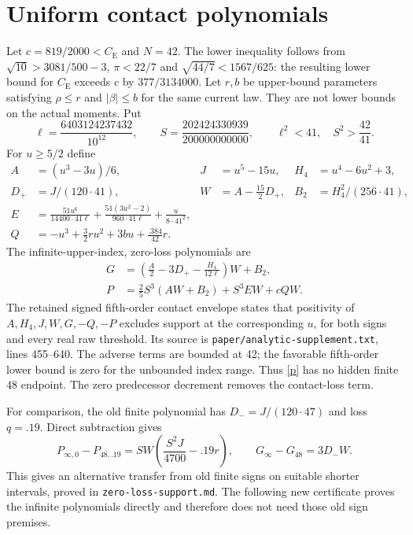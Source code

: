 \documentclass[11pt]{article}
\newcommand{\CE}{C_{\mathrm E}}
\begin{document}
\section{Uniform contact polynomials}
Let $c=819/2000<\CE$ and $N=42$. The lower inequality follows from
$\sqrt{10}>3081/500-3$, $\pi<22/7$ and
$\sqrt{44/7}<1567/625$: the resulting lower bound for $\CE$ exceeds
$c$ by $377/3134000$. Let $r,b$ be upper-bound parameters satisfying
$\rho\le r$ and $|\beta|\le b$ for the same current law.
They are not lower bounds on the actual moments. Put
\[
 \ell=\frac{6403124237432}{10^{12}},\qquad
 S=\frac{202424330939}{200000000000},\qquad
 \ell^2<41,\quad S^2>\frac{42}{41}.
\]
For $u\ge5/2$ define
\begin{align*}
 A&=(u^3-3u)/6,&J&=u^5-15u,&H_4&=u^4-6u^2+3,\\
 D_+&=J/(120\cdot41),&W&=A-\tfrac{15}{2}D_+,&B_2&=H_4^2/(256\cdot41),\\
 E&=\frac{51u^6}{14400\cdot41\ell}
      +\frac{51(3u^2-2)}{960\cdot41\ell}
      +\frac{u}{8\cdot41^2},\\
 Q&=-u^3+\tfrac32ru^2+3bu+\tfrac{.384}{42}r .
\end{align*}
The infinite-upper-index, zero-loss polynomials are
\begin{align}
 G&=\left(\tfrac A2-3D_+-\frac{H_4}{12\ell}\right)W+B_2,\label{g}\\
 P&=\tfrac25S^3(AW+B_2)+S^3EW+cQW.\label{p}
\end{align}
The retained signed fifth-order contact envelope states that positivity of
$A,H_4,J,W,G,-Q,-P$ excludes support at the corresponding $u$, for both signs
and every real raw threshold. Its source is
\texttt{paper/analytic-supplement.txt}, lines 455--640.
The adverse terms are bounded at 42; the favorable fifth-order lower bound is
zero for the unbounded index range. Thus \eqref{p} has no hidden finite 48
endpoint. The zero predecessor decrement removes the contact-loss term.

For comparison, the old finite polynomial has $D_-=J/(120\cdot47)$ and
loss $q=.19$. Direct subtraction gives
\[
 P_{\infty,0}-P_{48,.19}
 =SW\left(\frac{S^2J}{4700}-.19r\right),\qquad
 G_\infty-G_{48}=3D_-W.
\]
This gives an alternative transfer from old finite signs on suitable shorter
intervals, proved in \texttt{zero-loss-support.md}. The following new
certificate proves the infinite polynomials directly and therefore does not
need those old sign premises.
\end{document}
